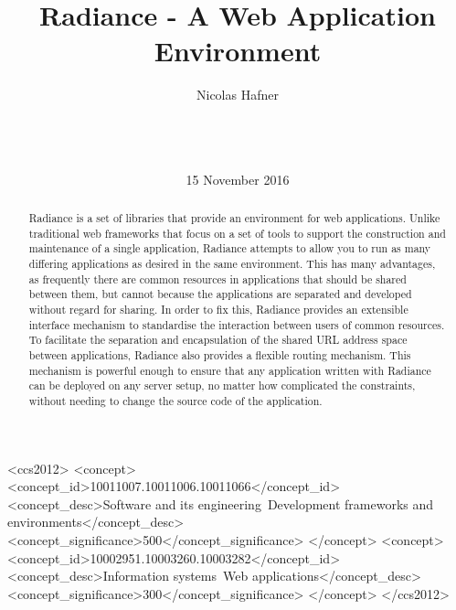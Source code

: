 \documentclass{sig-alternate-05-2015}
\begin{document}
\doi{}
\isbn{}

\begin{CCSXML}
  <ccs2012>
  <concept>
  <concept_id>10011007.10011006.10011066</concept_id>
  <concept_desc>Software and its engineering~Development frameworks and environments</concept_desc>
  <concept_significance>500</concept_significance>
  </concept>
  <concept>
  <concept_id>10002951.10003260.10003282</concept_id>
  <concept_desc>Information systems~Web applications</concept_desc>
  <concept_significance>300</concept_significance>
  </concept>
  </ccs2012>
\end{CCSXML}


\title{Radiance - A Web Application Environment}

\author{
\alignauthor
Nicolas Hafner\\
       \\
       \\
       \\
}
\date{15 November 2016}

\maketitle

\begin{abstract}
  Radiance is a set of libraries that provide an environment for web applications. Unlike traditional web frameworks that focus on a set of tools to support the construction and maintenance of a single application, Radiance attempts to allow you to run as many differing applications as desired in the same environment. This has many advantages, as frequently there are common resources in applications that should be shared between them, but cannot because the applications are separated and developed without regard for sharing. In order to fix this, Radiance provides an extensible interface mechanism to standardise the interaction between users of common resources. To facilitate the separation and encapsulation of the shared URL address space between applications, Radiance also provides a flexible routing mechanism. This mechanism is powerful enough to ensure that any application written with Radiance can be deployed on any server setup, no matter how complicated the constraints, without needing to change the source code of the application.
\end{abstract}
\end{document}
